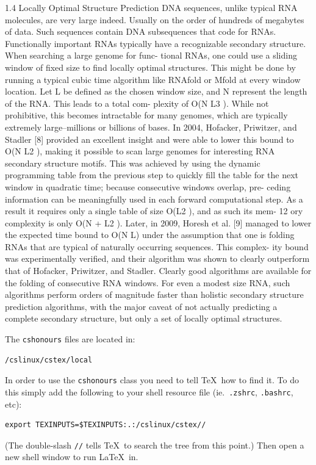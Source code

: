 \documentclass{cshonours}
\begin{document}
1.4 Locally Optimal Structure Prediction
DNA sequences, unlike typical RNA molecules, are very large indeed. Usually
on the order of hundreds of megabytes of data. Such sequences contain DNA
subsequences that code for RNAs. Functionally important RNAs typically have
a recognizable secondary structure. When searching a large genome for func-
tional RNAs, one could use a sliding window of fixed size to find locally optimal
structures. This might be done by running a typical cubic time algorithm like
RNAfold or Mfold at every window location. Let L be defined as the chosen
window size, and N represent the length of the RNA. This leads to a total com-
plexity of O(N L3 ). While not prohibitive, this becomes intractable for many
genomes, which are typically extremely large–millions or billions of bases. In
2004, Hofacker, Priwitzer, and Stadler [8] provided an excellent insight and were
able to lower this bound to O(N L2 ), making it possible to scan large genomes
for interesting RNA secondary structure motifs. This was achieved by using the
dynamic programming table from the previous step to quickly fill the table for
the next window in quadratic time; because consecutive windows overlap, pre-
ceding information can be meaningfully used in each forward computational step.
As a result it requires only a single table of size O(L2 ), and as such its mem-
12
ory complexity is only O(N + L2 ). Later, in 2009, Horesh et al. [9] managed
to lower the expected time bound to O(N L) under the assumption that one is
folding RNAs that are typical of naturally occurring sequences. This complex-
ity bound was experimentally verified, and their algorithm was shown to clearly
outperform that of Hofacker, Priwitzer, and Stadler. Clearly good algorithms are
available for the folding of consecutive RNA windows. For even a modest size
RNA, such algorithms perform orders of magnitude faster than holistic secondary
structure prediction algorithms, with the major caveat of not actually predicting
a complete secondary structure, but only a set of locally optimal structures.





The {\tt cshonours} files are located in:
\begin{verbatim}
/cslinux/cstex/local
\end{verbatim}

In order to use the {\tt cshonours} class you need to tell \TeX\ how
to find it. To do this simply add the following to your shell resource
file (ie.\ {\tt .zshrc}, {\tt .bashrc}, etc):
\begin{verbatim}
export TEXINPUTS=$TEXINPUTS:.:/cslinux/cstex//
\end{verbatim}
(The double-slash \verb!//! tells \TeX\ to search the tree from this
point.) Then open a new shell window to run \LaTeX\ in.
\end{document}
